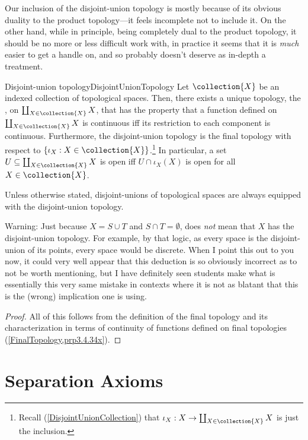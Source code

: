 Our inclusion of the disjoint-union topology is mostly because of its obvious duality to the product topology---it feels incomplete not to include it.  On the other hand, while in principle, being completely dual to the product topology, it should be no more or less difficult work with, in practice it seems that it is \emph{much} easier to get a handle on, and so probably doesn't deserve as in-depth a treatment.
\begin{prp}{Disjoint-union topology}{DisjointUnionTopology}
Let $\collection{X}$ be an indexed collection of topological spaces.  Then, there exists a unique topology, the , on $\coprod _{X\in \collection{X}}X$, that has the property that a function defined on $\coprod _{X\in \collection{X}}X$ is continuous iff its restriction to each component is continuous.  Furthermore, the disjoint-union topology is the final topology with respect to $\{ \iota _X:X\in \collection{X}\}$.\footnote{Recall (\cref{DisjointUnionCollection}) that $\iota _X:X\rightarrow \coprod _{X\in \collection{X}}X$ is just the inclusion.}  In particular, a set $U\subseteq \coprod _{X\in \collection{X}}X$ is open iff $U\cap \iota _X(X)$ is open for all $X\in \collection{X}$.
\begin{rmk}
Unless otherwise stated, disjoint-unions of topological spaces are always equipped with the disjoint-union topology.
\end{rmk}
\begin{wrn}
Warning:  Just because $X=S\cup T$ and $S\cap T=\emptyset$, does \emph{not} mean that $X$ has the disjoint-union topology.  For example, by that logic, as every space is the disjoint-union of its points, every space would be discrete.  When I point this out to you now, it could very well appear that this deduction is so obviously incorrect as to not be worth mentioning, but I have definitely seen students make what is essentially this very same mistake in contexts where it is not as blatant that this is the (wrong) implication one is using.
\end{wrn}
\begin{proof}
All of this follows from the definition of the final topology and its characterization in terms of continuity of functions defined on final topologies (\cref{FinalTopology,prp3.4.34x}).
\end{proof}
\end{prp}

\section{Separation Axioms}\label{sct4.5}

